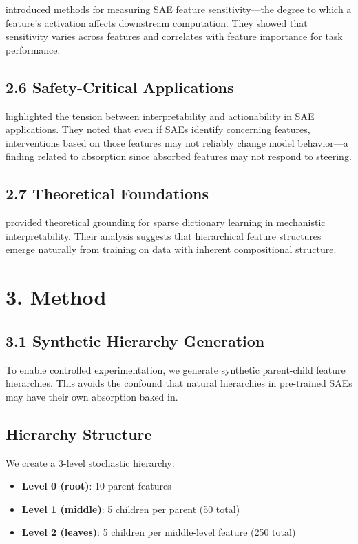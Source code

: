 \documentclass{article}
\begin{document}
\citet{hu2025measuring} introduced methods for measuring SAE feature sensitivity---the degree to which a feature's activation affects downstream computation. They showed that sensitivity varies across features and correlates with feature importance for task performance.

\subsection{2.6 Safety-Critical Applications}

\citet{basu2026interpretability} highlighted the tension between interpretability and actionability in SAE applications. They noted that even if SAEs identify concerning features, interventions based on those features may not reliably change model behavior---a finding related to absorption since absorbed features may not respond to steering.

\subsection{2.7 Theoretical Foundations}

\citet{tang2025theoretical} provided theoretical grounding for sparse dictionary learning in mechanistic interpretability. Their analysis suggests that hierarchical feature structures emerge naturally from training on data with inherent compositional structure.

\section{3. Method}

\subsection{3.1 Synthetic Hierarchy Generation}

To enable controlled experimentation, we generate synthetic parent-child feature hierarchies. This avoids the confound that natural hierarchies in pre-trained SAEs may have their own absorption baked in.

\subsection{Hierarchy Structure}

We create a 3-level stochastic hierarchy:
\begin{itemize}
\item \textbf{Level 0 (root)}: 10 parent features
\item \textbf{Level 1 (middle)}: 5 children per parent (50 total)
\item \textbf{Level 2 (leaves)}: 5 children per middle-level feature (250 total)
\end{itemize}
\end{document}

